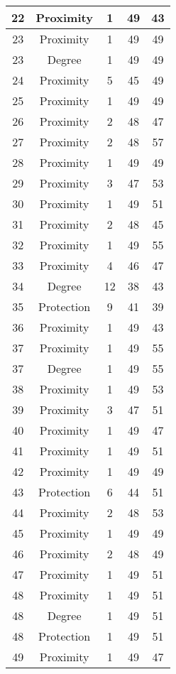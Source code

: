 \documentclass[results.tex]{subfiles}
\begin{document}
\begin{center}
\begin{tabular}{| c || c | c | c | c |}
    \hline
    22 & Proximity & 1 & 49 & 43 \\ 
    \hline
    23 & Proximity & 1 & 49 & 49 \\ 
    \hline
    23 & Degree & 1 & 49 & 49 \\ 
    \hline
    24 & Proximity & 5 & 45 & 49 \\ 
    \hline
    25 & Proximity & 1 & 49 & 49 \\ 
    \hline
    26 & Proximity & 2 & 48 & 47 \\ 
    \hline
    27 & Proximity & 2 & 48 & 57 \\ 
    \hline
    28 & Proximity & 1 & 49 & 49 \\ 
    \hline
    29 & Proximity & 3 & 47 & 53 \\ 
    \hline
    30 & Proximity & 1 & 49 & 51 \\ 
    \hline
    31 & Proximity & 2 & 48 & 45 \\ 
    \hline
    32 & Proximity & 1 & 49 & 55 \\ 
    \hline
    33 & Proximity & 4 & 46 & 47 \\ 
    \hline
    34 & Degree & 12 & 38 & 43 \\ 
    \hline
    35 & Protection & 9 & 41 & 39 \\ 
    \hline
    36 & Proximity & 1 & 49 & 43 \\ 
    \hline
    37 & Proximity & 1 & 49 & 55 \\ 
    \hline
    37 & Degree & 1 & 49 & 55 \\ 
    \hline
    38 & Proximity & 1 & 49 & 53 \\ 
    \hline
    39 & Proximity & 3 & 47 & 51 \\ 
    \hline
    40 & Proximity & 1 & 49 & 47 \\ 
    \hline
    41 & Proximity & 1 & 49 & 51 \\ 
    \hline
    42 & Proximity & 1 & 49 & 49 \\ 
    \hline
    43 & Protection & 6 & 44 & 51 \\ 
    \hline
    44 & Proximity & 2 & 48 & 53 \\ 
    \hline
    45 & Proximity & 1 & 49 & 49 \\ 
    \hline
    46 & Proximity & 2 & 48 & 49 \\ 
    \hline
    47 & Proximity & 1 & 49 & 51 \\ 
    \hline
    48 & Proximity & 1 & 49 & 51 \\ 
    \hline
    48 & Degree & 1 & 49 & 51 \\ 
    \hline
    48 & Protection & 1 & 49 & 51 \\ 
    \hline
    49 & Proximity & 1 & 49 & 47 \\ 
    \hline   \end{tabular}
\end{center}
\end{document}
